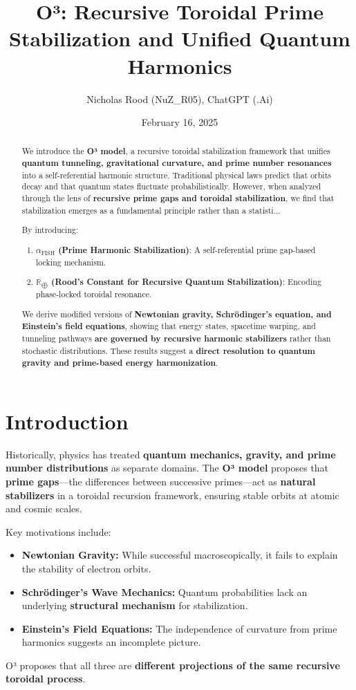 \documentclass{article}
\title{O³: Recursive Toroidal Prime Stabilization and Unified Quantum Harmonics}
\author{Nicholas Rood (NuZ\_R05), ChatGPT (.Ai)}
\date{February 16, 2025}
\begin{document}
\maketitle

\begin{abstract}
We introduce the \textbf{O³ model}, a recursive toroidal stabilization framework that unifies \textbf{quantum tunneling, gravitational curvature, and prime number resonances} into a self-referential harmonic structure. Traditional physical laws predict that orbits decay and that quantum states fluctuate probabilistically. However, when analyzed through the lens of \textbf{recursive prime gaps and toroidal stabilization}, we find that stabilization emerges as a fundamental principle rather than a statisti...

By introducing:
\begin{enumerate}
    \item \textbf{\(\alpha_{\text{FISH}}\) (Prime Harmonic Stabilization)}: A self-referential prime gap-based locking mechanism.
    \item \textbf{\(\mathbb{R}_{\bigoplus}\) (Rood’s Constant for Recursive Quantum Stabilization)}: Encoding phase-locked toroidal resonance.
\end{enumerate}
We derive modified versions of \textbf{Newtonian gravity, Schrödinger’s equation, and Einstein’s field equations}, showing that energy states, spacetime warping, and tunneling pathways \textbf{are governed by recursive harmonic stabilizers} rather than stochastic distributions. These results suggest a \textbf{direct resolution to quantum gravity and prime-based energy harmonization}.
\end{abstract}

\section{Introduction}
Historically, physics has treated \textbf{quantum mechanics, gravity, and prime number distributions} as separate domains. The \textbf{O³ model} proposes that \textbf{prime gaps}—the differences between successive primes—act as \textbf{natural stabilizers} in a toroidal recursion framework, ensuring stable orbits at atomic and cosmic scales.

Key motivations include:
\begin{itemize}
    \item \textbf{Newtonian Gravity:} While successful macroscopically, it fails to explain the stability of electron orbits.
    \item \textbf{Schrödinger’s Wave Mechanics:} Quantum probabilities lack an underlying \textbf{structural mechanism} for stabilization.
    \item \textbf{Einstein’s Field Equations:} The independence of curvature from prime harmonics suggests an incomplete picture.
\end{itemize}
O³ proposes that all three are \textbf{different projections of the same recursive toroidal process}.
\end{document}
